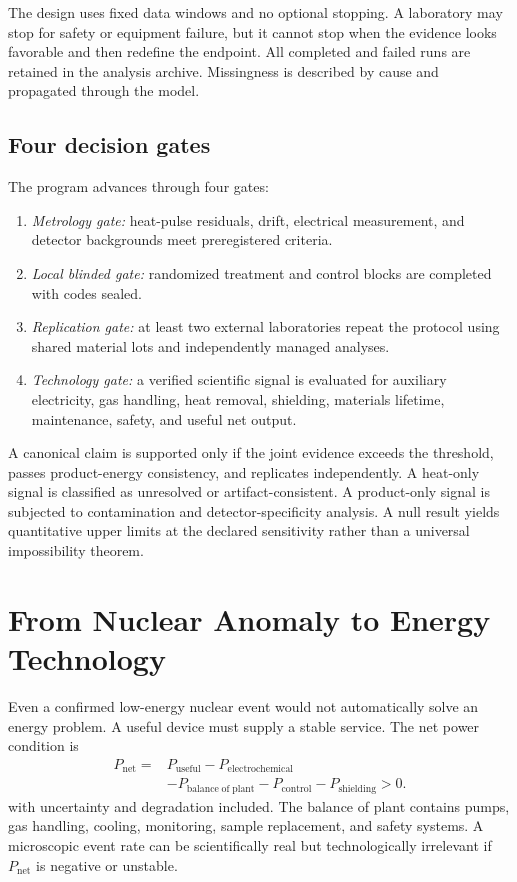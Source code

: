 \documentclass[conference]{IEEEtran}
\begin{document}
The design uses fixed data windows and no optional stopping. A laboratory may stop for safety or equipment failure, but it cannot stop when the evidence looks favorable and then redefine the endpoint. All completed and failed runs are retained in the analysis archive. Missingness is described by cause and propagated through the model.

\subsection{Four decision gates}
The program advances through four gates:
\begin{enumerate}
\item \emph{Metrology gate:} heat-pulse residuals, drift, electrical measurement, and detector backgrounds meet preregistered criteria.
\item \emph{Local blinded gate:} randomized treatment and control blocks are completed with codes sealed.
\item \emph{Replication gate:} at least two external laboratories repeat the protocol using shared material lots and independently managed analyses.
\item \emph{Technology gate:} a verified scientific signal is evaluated for auxiliary electricity, gas handling, heat removal, shielding, materials lifetime, maintenance, safety, and useful net output.
\end{enumerate}

A canonical claim is supported only if the joint evidence exceeds the threshold, passes product-energy consistency, and replicates independently. A heat-only signal is classified as unresolved or artifact-consistent. A product-only signal is subjected to contamination and detector-specificity analysis. A null result yields quantitative upper limits at the declared sensitivity rather than a universal impossibility theorem.

\section{From Nuclear Anomaly to Energy Technology}
\label{sec:technology}
Even a confirmed low-energy nuclear event would not automatically solve an energy problem. A useful device must supply a stable service. The net power condition is
\begin{equation}
\begin{aligned}
P_{\mathrm{net}}={}&P_{\mathrm{useful}}-P_{\mathrm{electrochemical}}\\
&-P_{\mathrm{balance\;of\;plant}}-P_{\mathrm{control}}-P_{\mathrm{shielding}}>0.
\end{aligned}
\label{eq:net}
\end{equation}
with uncertainty and degradation included. The balance of plant contains pumps, gas handling, cooling, monitoring, sample replacement, and safety systems. A microscopic event rate can be scientifically real but technologically irrelevant if $P_{\mathrm{net}}$ is negative or unstable.
\end{document}
